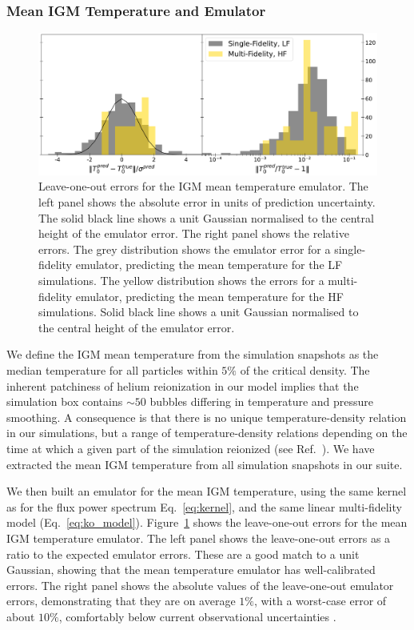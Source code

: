 \documentclass[a4paper,11pt]{article}
\begin{document}

\subsubsection{Mean IGM Temperature and Emulator}

\begin{figure}
    \centering
    \includegraphics[width=\textwidth]{figures/t0emu_errors.pdf}
    \caption{\label{fig:t0_error}
    Leave-one-out errors for the IGM mean temperature emulator.
    The left panel shows the absolute error in units of prediction uncertainty. The solid black line shows a unit Gaussian normalised to the central height of the emulator error. The right panel shows the relative errors.
    The grey distribution shows the emulator error for a single-fidelity emulator, predicting the mean temperature for the LF simulations.
    The yellow distribution shows the errors for a multi-fidelity emulator, predicting the mean temperature for the HF simulations. Solid black line shows a unit Gaussian normalised to the central height of the emulator error.
    }
\end{figure}

We define the IGM mean temperature from the simulation snapshots as the median temperature for all particles within $5\%$ of the critical density.
The inherent patchiness of helium reionization in our model implies that the simulation box contains $\sim 50$ bubbles differing in temperature and pressure smoothing. A consequence is that there is no unique temperature-density relation in our simulations, but a range of temperature-density relations depending on the time at which a given part of the simulation reionized (see Ref.~\cite{UptonSanderbeck:2020}). We have extracted the mean IGM temperature from all simulation snapshots in our suite.

We then built an emulator for the mean IGM temperature, using the same kernel as for the flux power spectrum Eq.~\ref{eq:kernel}, and the same linear multi-fidelity model (Eq.~\ref{eq:ko_model}). Figure~\ref{fig:t0_error} shows the leave-one-out errors for the mean IGM temperature emulator. The left panel shows the leave-one-out errors as a ratio to the expected emulator errors. These are a good match to a unit Gaussian, showing that the mean temperature emulator has well-calibrated errors. The right panel shows the absolute values of the leave-one-out emulator errors, demonstrating that they are on average $1\%$, with a worst-case error of about $10\%$, comfortably below current observational uncertainties \cite{Gaikwad:2020}.
\end{document}
